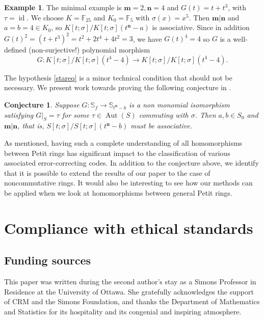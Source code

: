 \documentclass[11pt]{amsart}
\theoremstyle{plain}
\newtheorem{conjecture}[theorem]{Conjecture}
\theoremstyle{definition}
\newtheorem{example}[theorem]{Example}
\numberwithin{equation}{section}
\numberwithin{figure}{section}
\newcommand{\Sone}[1]{\Stsigma/\Stsigma (t^{\de}-#1)} %
\newcommand{\ring}{S}
\newcommand{\field}{K}
\newcommand{\Ktsigma}{K[t;\sigma]}
\newcommand{\Stsigma}{S[t;\sigma]}
\newcommand{\Kone}[1]{K[t;\sigma]/K[t;\sigma](t^{\de}-#1)}
\DeclareMathOperator{\id}{id}
\newcommand{\os}{\mathbf{m}}  %
\newcommand{\de}{\mathbf{n}}  %
\DeclareMathOperator{\Aut}{Aut}
\begin{document}
\begin{example}
    The minimal example is $\os=2,\de=4$ and $G(t)=t+t^3$, with $\tau=\id$.  We choose $\field=\mathbb{F}_{25}$ and $\field_0=\mathbb{F}_5$ with $\sigma(x)=x^5$.  Then $\os|\de$ and $a=b=4\in \field_0$, so $\Kone{a}$ is associative.
Since in addition $G(t)^2=(t+t^3)^2=t^2+2t^4+4t^2=3$, we have $G(t)^4=4$ so $G$ is a well-defined (non-surjective!) polynomial morphism
    $$
    G: \Ktsigma/\Ktsigma(t^4-4)\to \Ktsigma/\Ktsigma(t^4-4).
    $$
\end{example}



The hypothesis \eqref{stareq} is a minor technical condition that should not be necessary.  We present work towards proving the following conjecture in \cite{NevinsPumpluen2026}.

\begin{conjecture}
    \label{conj:nonmonomial}
    Suppose $G: \mathbb{S}_{f} \to \mathbb{S}_{t^\de-b}$ is a non monomial isomorphism satisfying $G|_{\ring}=\tau$ for some $\tau\in \Aut(\ring)$ commuting with $\sigma$.  Then  $a,b\in \ring_0$ and $\os|\de$, that is, $\Sone{b}$ must be associative.
\end{conjecture}

As mentioned, having such a complete understanding of all homomorphisms between Petit rings has significant impact to the classification of various associated  error-correcting codes.  In addition to the conjecture above, we identify that it is possible to extend the results of our paper to the case of noncommutative rings.  It would also be interesting to see how our methods can be applied when we
look at homomorphisms between general Petit rings.

\section{Compliance with ethical standards}

\subsection*{Funding sources} This paper was written during the second author's stay as a Simons Professor in Residence at the University of Ottawa. She gratefully acknowledges the support of CRM and the Simons Foundation, and thanks the Department of Mathematics and Statistics for its hospitality and its congenial and inspiring atmosphere.
\end{document}
